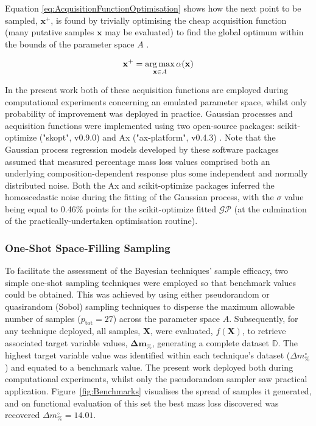 Equation \ref{eq:AcquisitionFunctionOptimisation} shows how the next point
 to be sampled, \(\mathbf{x}^{+}\), is found by trivially optimising
 the cheap acquisition function (many putative samples \(\textbf{x}\) may be
 evaluated) to find the global optimum within the bounds of the parameter 
 space \(A\) \autocite{Teh2020}.

\begin{equation}\label{eq:AcquisitionFunctionOptimisation}
    \mathbf{x}^{+}=\operatorname*{arg\,max}_{\mathbf{x}\in A}\alpha(\mathbf{x})
\end{equation}

In the present work both of these acquisition functions
 are employed during computational experiments concerning an emulated
 parameter space, whilst only probability of improvement was deployed in
 practice.
Gaussian processes and acquisition functions were implemented using two
 open-source packages: scikit-optimize ("skopt", v0.9.0) \autocite{Kernc2021}
 and Ax ("ax-platform", v0.4.3) \autocite{Facebook2024}.
Note that the Gaussian process regression models developed by these software
 packages assumed that measured percentage mass loss values comprised both
 an underlying composition-dependent response plus some independent and
 normally distributed noise.
Both the Ax and scikit-optimize packages inferred the homoscedastic noise
 during the fitting of the Gaussian process, with the \(\sigma\) value
 being equal to 0.46\% points for the scikit-optimize fitted \(\mathcal{GP}\)
 (at the culmination of the practically-undertaken optimisation routine).

\subsubsection{One-Shot Space-Filling Sampling}
To facilitate the assessment of the Bayesian techniques' sample efficacy,
 two simple one-shot sampling techniques were employed so that benchmark 
 values could be obtained.
This was achieved by using either pseudorandom or quasirandom (Sobol) sampling 
 techniques to disperse the maximum allowable number of samples 
 (\(p_{\text{tot}}=27\)) across the parameter space \(A\).
Subsequently, for any technique deployed, all samples, \(\mathbf{X}\), were 
 evaluated, \(f(\mathbf{X})\), to retrieve associated target variable 
 values, \(\mathbf{\Delta m_{\%}}\), generating a complete dataset \(\mathbb{D}\).
The highest target variable value was identified within each technique's dataset 
 (\(\Delta m_{\%}^{\circ}\)) and equated to a benchmark value.
The present work deployed both during computational experiments, whilst only
 the pseudorandom sampler saw practical application. 
Figure~\ref{fig:Benchmarks} visualises the spread of samples it generated, 
 and on functional evaluation of this set the best mass loss discovered was 
 recovered \(\Delta m_{\%}^{\circ}=14.01\).

